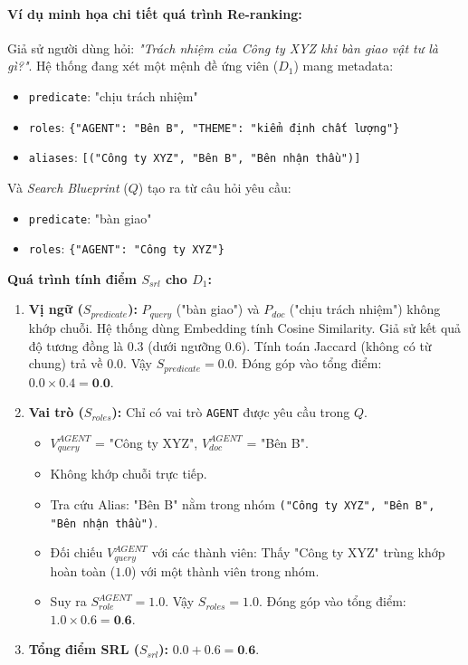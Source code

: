 \paragraph{Ví dụ minh họa chi tiết quá trình Re-ranking:}
Giả sử người dùng hỏi: \textit{"Trách nhiệm của Công ty XYZ khi bàn giao vật tư là gì?"}. Hệ thống đang xét một mệnh đề ứng viên ($D_1$) mang metadata: 
\begin{itemize}
    \item \texttt{predicate}: "chịu trách nhiệm"
    \item \texttt{roles}: \texttt{\{"AGENT": "Bên B", "THEME": "kiểm định chất lượng"\}}
    \item \texttt{aliases}: \texttt{[("Công ty XYZ", "Bên B", "Bên nhận thầu")]}
\end{itemize}
Và \textit{Search Blueprint} ($Q$) tạo ra từ câu hỏi yêu cầu:
\begin{itemize}
    \item \texttt{predicate}: "bàn giao"
    \item \texttt{roles}: \texttt{\{"AGENT": "Công ty XYZ"\}}
\end{itemize}

\textbf{Quá trình tính điểm $S_{srl}$ cho $D_1$:}
\begin{enumerate}
    \item \textbf{Vị ngữ ($S_{predicate}$):} $P_{query}$ ("bàn giao") và $P_{doc}$ ("chịu trách nhiệm") không khớp chuỗi. Hệ thống dùng Embedding tính Cosine Similarity. Giả sử kết quả độ tương đồng là $0.3$ (dưới ngưỡng $0.6$). Tính toán Jaccard (không có từ chung) trả về $0.0$. Vậy $S_{predicate} = 0.0$. Đóng góp vào tổng điểm: $0.0 \times 0.4 = \textbf{0.0}$.
    \item \textbf{Vai trò ($S_{roles}$):} Chỉ có vai trò \texttt{AGENT} được yêu cầu trong $Q$. 
    \begin{itemize}
        \item $V_{query}^{AGENT}$ = "Công ty XYZ", $V_{doc}^{AGENT}$ = "Bên B".
        \item Không khớp chuỗi trực tiếp.
        \item Tra cứu Alias: "Bên B" nằm trong nhóm \texttt{("Công ty XYZ", "Bên B", "Bên nhận thầu")}.
        \item Đối chiếu $V_{query}^{AGENT}$ với các thành viên: Thấy "Công ty XYZ" trùng khớp hoàn toàn ($1.0$) với một thành viên trong nhóm.
        \item Suy ra $S_{role}^{AGENT} = 1.0$. Vậy $S_{roles} = 1.0$. Đóng góp vào tổng điểm: $1.0 \times 0.6 = \textbf{0.6}$.
    \end{itemize}
    \item \textbf{Tổng điểm SRL ($S_{srl}$):} $0.0 + 0.6 = \textbf{0.6}$.
\end{enumerate}

